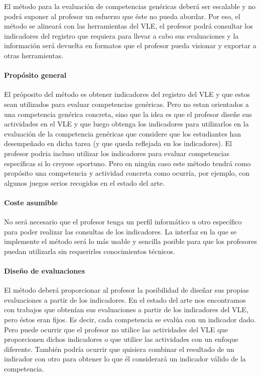 El método para la evaluación de competencias genéricas deberá ser escalable y no podrá suponer al profesor un esfuerzo que éste no pueda abordar. Por eso, el método se alineará con las herramientas del VLE, el profesor podrá consultar los indicadores del registro que requiera para llevar a cabo sus evaluaciones y la información será devuelta en formatos que el profesor pueda visionar y exportar a otras herramientas.

\paragraph*{Propósito general}

El próposito del método es obtener indicadores del registro del VLE y que estos sean utilizados para evaluar competencias genéricas. Pero no estan orientados a una competencia genérica concreta, sino que la idea es que el profesor diseñe sus actividades en el VLE y que luego obtenga los indicadores para utilizarlos en la evaluación de la competencia genéricas que considere que los estudiantes han desempeñado en dicha tarea (y que queda reflejada en los indicadores). El profesor podria incluso utilizar los indicadores para evaluar competencias específicas si lo creyese oportuno. Pero en ningún caso este método tendrá como propósito una competencia y actividad concreta como ocurría, por ejemplo, con algunos juegos serios recogidos en el estado del arte.

\paragraph*{Coste asumible}

No será necesario que el profesor tenga un perfil informático u otro específico para poder realizar las consultas de los indicadores. La interfaz en la que se implemente el método será lo más usable y sencilla posible para que los profesores puedan utilizarla sin requerirles conocimientos técnicos.

\paragraph*{Diseño de evaluaciones}

El método deberá proporcionar al profesor la posibilidad de diseñar sus propias evaluaciones a partir de los indicadores. En el estado del arte nos encontramos con trabajos que obtenían sus evaluaciones a partir de los indicadores del VLE, pero éstos eran fijos. Es decir, cada competencia se evalúa con un indicador dado. Pero puede ocurrir que el profesor no utilice las actividades del VLE que proporcionen dichos indicadores o que utilice las actividades con un enfoque diferente. También podría ocurrir que quisiera combinar el resultado de un indicador con otro para obtener lo que él considerará un indicador válido de la competencia. 


